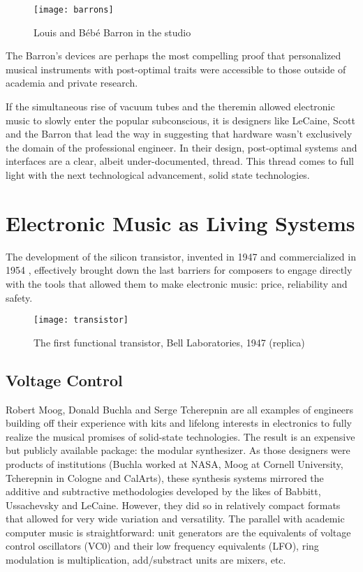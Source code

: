 	\begin{figure}[H]
	  \caption{Louis and Bébé Barron in the studio}
	  \centering
	    \texttt{[image: barrons]}
	\end{figure} 
	
The Barron's devices are perhaps the most compelling proof that personalized musical instruments with post-optimal traits were accessible to those outside of academia and private research.

If the simultaneous rise of vacuum tubes and the theremin allowed electronic music to slowly enter the popular subconscious, it is designers like LeCaine, Scott and the Barron that lead the way in suggesting that hardware wasn't exclusively the domain of the professional engineer. In their design, post-optimal systems and interfaces are a clear, albeit under-documented, thread. This thread comes to full light with the next technological advancement, solid state technologies. 

\section{Electronic Music as Living Systems}

The development of the silicon transistor, invented in 1947 and commercialized in 1954 \citep{texasinstrument}, effectively brought down the last barriers for composers to engage directly with the tools that allowed them to make electronic music: price, reliability and safety.  

\begin{figure}[H]
    \centering
    \texttt{[image: transistor]}
    \caption{The first functional transistor, Bell Laboratories, 1947 (replica)}
\end{figure}

\subsection{Voltage Control}

Robert Moog, Donald Buchla and Serge Tcherepnin are all examples of engineers building off their experience with kits and lifelong interests in electronics to fully realize the musical promises of solid-state technologies. The result is an expensive but publicly available package: the modular synthesizer. As those designers were products of institutions (Buchla worked at NASA, Moog at Cornell University, Tcherepnin in Cologne and CalArts), these synthesis systems mirrored the additive and subtractive methodologies developed by the likes of Babbitt, Ussachevsky and LeCaine. However, they did so in relatively compact formats that allowed for very wide variation and versatility. The parallel with academic computer music is straightforward: unit generators are the equivalents of voltage control oscillators (VC0) and their low frequency equivalents (LFO), ring modulation is multiplication, add/substract units are mixers, etc. 

